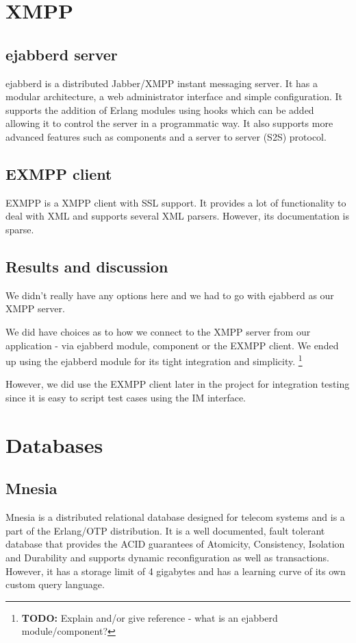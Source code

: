 \documentclass[11pt,a4paper]{report}
\newcommand{\todo}[1]{\footnote{{\color{red} {\bf TODO:} #1}}}
\begin{document}
\section{XMPP}
\subsection{ejabberd server}
ejabberd is a distributed Jabber/XMPP instant messaging server. It has a modular
architecture, a web administrator interface and simple configuration. It
supports the addition of Erlang modules using hooks which can be added allowing
it to control the server in a programmatic way. It also supports more advanced
features such as components and a server to server (S2S) protocol.

\subsection{EXMPP client}
EXMPP is a XMPP client with SSL support. It provides a lot of functionality to
deal with XML and supports several XML parsers. However, its documentation is
sparse.

\subsection{Results and discussion}
We didn't really have any options here and we had to go with ejabberd as our
XMPP server.

We did have choices as to how we connect to the XMPP server from our application
- via ejabberd module, component or the EXMPP client. We ended up using the
ejabberd module for its tight integration and simplicity.
\todo{Explain and/or give reference - what is an ejabberd module/component?}

However, we did use the EXMPP client later in the project for integration
testing since it is easy to script test cases using the IM interface.

\section{Databases}
\subsection{Mnesia}
Mnesia is a distributed relational database designed for telecom systems and is
a part of the Erlang/OTP distribution. It is a well documented, fault tolerant
database that provides the ACID\cite{ACID} guarantees of Atomicity, Consistency,
Isolation and Durability and supports dynamic reconfiguration as well
as transactions. However, it has a storage limit of 4 gigabytes and has a
learning curve of its own custom query language.
\end{document}
